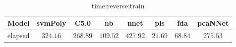 \begin{table}[!ht]
	\centering
	\begin{tabular}{|c|c|c|c|c|c|c|c|}
		\hline
		Model & svmPoly & C5.0 & nb & nnet & pls & fda & pcaNNet \\ \hline
		elapsed & $324.16$ & $268.89$ & $109.52$ & $427.92$ & $21.69$ & $68.84$ & $275.53$ \\ \hline
	\end{tabular}
	\caption{time:reverse:train}
	\label{tab:time:reverse:train}
\end{table}
